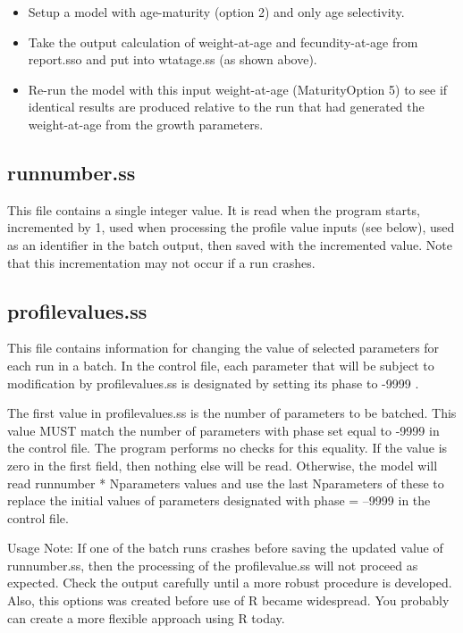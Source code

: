 		\begin{itemize}
			\item Setup a model with age-maturity (option 2) and only age selectivity.
			\item Take the output calculation of weight-at-age and fecundity-at-age  from report.sso and put into wtatage.ss (as shown above).
			\item Re-run the model with this input weight-at-age (Maturity\textunderscore Option 5) to see if identical results are produced relative to the run that had generated the weight-at-age from the growth parameters.
		\end{itemize}


\subsection{runnumber.ss}
This file contains a single integer value.  It is read when the program starts, incremented by 1, used when processing the profile value inputs (see below), used as an identifier in the batch output, then saved with the incremented value.  Note that this incrementation may not occur if a run crashes.

\subsection{profilevalues.ss}	
This file contains information for changing the value of selected parameters for each run in a batch.  In the control file, each parameter that will be subject to modification by profilevalues.ss is designated by setting its phase to -9999 .

The first value in profilevalues.ss is the number of parameters to be batched.  This value MUST match the number of parameters with phase set equal to -9999 in the control file.  The program performs no checks for this equality.  If the value is zero in the first field, then nothing else will be read.  Otherwise, the model will read runnumber * Nparameters values and use the last Nparameters of these to replace the initial values of parameters designated with phase = --9999 in the control file.

Usage Note: If one of the batch runs crashes before saving the updated value of runnumber.ss, then the processing of the profilevalue.ss will not proceed as expected.  Check the output carefully until a more robust procedure is developed. Also, this options was created before use of R became widespread.  You probably can create a more flexible approach using R today.


\pagebreak